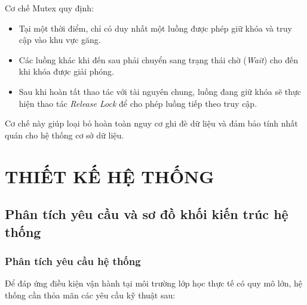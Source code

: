 \documentclass[12pt,a4paper]{report}
\begin{document}
Cơ chế Mutex quy định:

\begin{itemize}

\item Tại một thời điểm, chỉ có duy nhất một luồng được phép giữ khóa và truy cập vào khu vực găng.

\item Các luồng khác khi đến sau phải chuyển sang trạng thái chờ (\textit{Wait}) cho đến khi khóa được giải phóng.

\item Sau khi hoàn tất thao tác với tài nguyên chung, luồng đang giữ khóa sẽ thực hiện thao tác \textit{Release Lock} để cho phép luồng tiếp theo truy cập.

\end{itemize}

Cơ chế này giúp loại bỏ hoàn toàn nguy cơ ghi đè dữ liệu và đảm bảo tính nhất quán cho hệ thống cơ sở dữ liệu.

\chapter{THIẾT KẾ HỆ THỐNG}

\section{Phân tích yêu cầu và sơ đồ khối kiến trúc hệ thống}

\subsection{Phân tích yêu cầu hệ thống}

Để đáp ứng điều kiện vận hành tại môi trường lớp học thực tế có quy mô lớn, hệ thống cần thỏa mãn các yêu cầu kỹ thuật sau:
\end{document}

